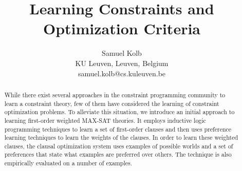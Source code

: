 \documentclass[letterpaper]{article}
\theoremstyle{definition}
\begin{document}
\title{Learning Constraints and Optimization Criteria}
\author{
  Samuel Kolb\\
  KU Leuven, Leuven, Belgium\\
  samuel.kolb@cs.kuleuven.be
}

\maketitle

\begin{abstract}

While there exist several approaches in the constraint programming community to learn a constraint theory, few of them have considered the learning of constraint optimization problems.
To alleviate this situation, we introduce an initial approach to learning first-order weighted MAX-SAT theories. 
It employs inductive logic programming techniques to learn a set of first-order clauses and then uses preference learning techniques to learn the weights of the clauses.
In order to learn these weighted clauses, the clausal optimization system uses examples of possible worlds and a set of preferences that state what examples are preferred over others.
The technique is also empirically evaluated on a number of examples.

\end{abstract}

\end{document}
